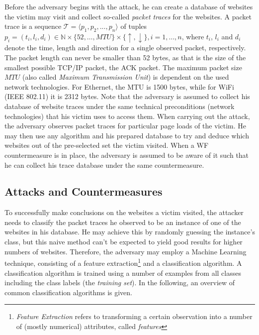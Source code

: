 \documentclass[
	ruledheaders=chapter,
	class=report,
	thesis={type=master, department=inf},
	accentcolor=1c,
	custommargins=true,
	marginpar=false,
	parskip=half-,
	fontsize=11pt,
]{tudapub}
\begin{document}
	Before the adversary begins with the attack, he can create a database of websites the victim may visit and collect so-called \textit{packet traces} for the websites. A packet trace is a sequence $\mathcal{T} = \langle p_1,p_2,...,p_n\rangle$ of tuples $p_i = (t_i, l_i, d_i) \in \mathbb{N} \times \{52, \ldots, MTU\} \times \{\uparrow, \downarrow\}, i = 1,\ldots,n$, where $t_i$, $l_i$ and $d_i$ denote the time, length and direction for a single observed packet, respectively. The packet length can never be smaller than 52 bytes, as that is the size of the smallest possible TCP/IP packet, the ACK packet. The maximum packet size $MTU$ (also called \textit{Maximum Transmission Unit}) is dependent on the used network technologies. For Ethernet, the MTU is 1500 bytes, while for WiFi (IEEE 802.11) it is 2312 bytes. Note that the adversary is assumed to collect his database of website traces under the same technical preconditions (network technologies) that his victim uses to access them. When carrying out the attack, the adversary observes packet traces for particular page loads of the victim. He may then use any algorithm and his prepared database to try and deduce which websites out of the pre-selected set the victim visited. When a WF countermeasure is in place, the adversary is assumed to be aware of it such that he can collect his trace database under the same countermeasure.
	
	\subsection{Attacks and Countermeasures}
	\label{theoretical:attacks_and_defenses}
	
	To successfully make conclusions on the websites a victim visited, the attacker needs to classify the packet traces he observed to be an instance of one of the websites in his database. He may achieve this by randomly guessing the instance's class, but this naive method can't be expected to yield good results for higher numbers of websites. Therefore, the adversary may employ a Machine Learning technique, consisting of a feature extraction\footnote{\textit{Feature Extraction} refers to transforming a certain observation into a number of (mostly numerical) attributes, called \textit{features}} and a classification algorithm. A classification algorithm is trained using a number of examples from all classes including the class labels (the \textit{training set}). In the following, an overview of common classification algorithms is given.
	
\end{document}
